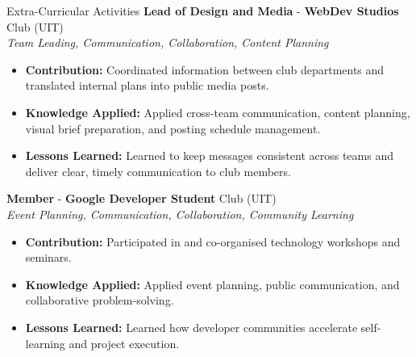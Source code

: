\documentclass{resume}
\begin{document}
\begin{rSection}{Extra-Curricular Activities}
    \vspace{-2pt}
    \itemsep -3pt {}
    \textbf{Lead of Design and Media} - \textbf{WebDev Studios} Club (UIT)\\
    {\small \textit{Team Leading, Communication, Collaboration, Content Planning}}
    \begin{itemize}
        \itemsep -4pt {}
        \item \textbf{Contribution:} Coordinated information between club departments and translated internal plans into public media posts.
        \item \textbf{Knowledge Applied:} Applied cross-team communication, content planning, visual brief preparation, and posting schedule management.
        \item \textbf{Lessons Learned:} Learned to keep messages consistent across teams and deliver clear, timely communication to club members.
    \end{itemize}
    \textbf{Member} - \textbf{Google Developer Student} Club (UIT)\\
    {\small \textit{Event Planning, Communication, Collaboration, Community Learning}}
    \begin{itemize}
        \itemsep -4pt {}
        \item \textbf{Contribution:} Participated in and co-organised technology workshops and seminars.
        \item \textbf{Knowledge Applied:} Applied event planning, public communication, and collaborative problem-solving.
        \item \textbf{Lessons Learned:} Learned how developer communities accelerate self-learning and project execution.
    \end{itemize}
\end{rSection}
\end{document}
